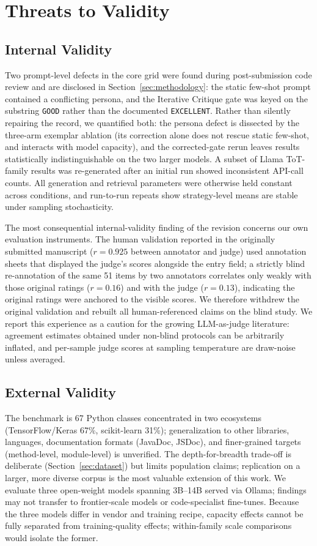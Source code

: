\documentclass[pdflatex,sn-mathphys-ay]{sn-jnl}%
\theoremstyle{thmstyleone}%
\theoremstyle{thmstyletwo}%
\theoremstyle{thmstylethree}%
\begin{document}
{\color{blue}
\section{Threats to Validity}
\label{sec:threats}

\subsection{Internal Validity}
Two prompt-level defects in the core grid were found during post-submission code review and are disclosed in Section~\ref{sec:methodology}: the static few-shot prompt contained a conflicting persona, and the Iterative Critique gate was keyed on the substring \texttt{GOOD} rather than the documented \texttt{EXCELLENT}. Rather than silently repairing the record, we quantified both: the persona defect is dissected by the three-arm exemplar ablation (its correction alone does not rescue static few-shot, and interacts with model capacity), and the corrected-gate rerun leaves results statistically indistinguishable on the two larger models. A subset of Llama ToT-family results was re-generated after an initial run showed inconsistent API-call counts. All generation and retrieval parameters were otherwise held constant across conditions, and run-to-run repeats show strategy-level means are stable under sampling stochasticity.

The most consequential internal-validity finding of the revision concerns our own evaluation instruments. The human validation reported in the originally submitted manuscript ($r=0.925$ between annotator and judge) used annotation sheets that displayed the judge's scores alongside the entry field; a strictly blind re-annotation of the same 51 items by two annotators correlates only weakly with those original ratings ($r=0.16$) and with the judge ($r=0.13$), indicating the original ratings were anchored to the visible scores. We therefore withdrew the original validation and rebuilt all human-referenced claims on the blind study. We report this experience as a caution for the growing LLM-as-judge literature: agreement estimates obtained under non-blind protocols can be arbitrarily inflated, and per-sample judge scores at sampling temperature are draw-noise unless averaged.

\subsection{External Validity}
The benchmark is 67 Python classes concentrated in two ecosystems (TensorFlow/Keras 67\%, scikit-learn 31\%); generalization to other libraries, languages, documentation formats (JavaDoc, JSDoc), and finer-grained targets (method-level, module-level) is unverified. The depth-for-breadth trade-off is deliberate (Section~\ref{sec:dataset}) but limits population claims; replication on a larger, more diverse corpus is the most valuable extension of this work. We evaluate three open-weight models spanning 3B--14B served via Ollama; findings may not transfer to frontier-scale models or code-specialist fine-tunes. Because the three models differ in vendor and training recipe, capacity effects cannot be fully separated from training-quality effects; within-family scale comparisons would isolate the former.

}
\end{document}
